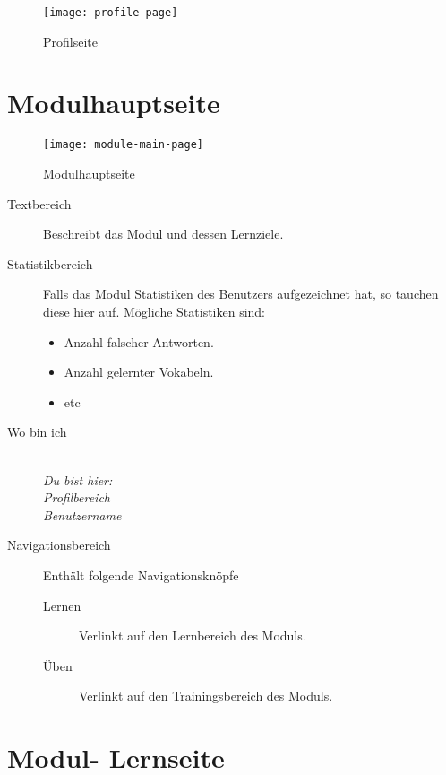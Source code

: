 \begin{figure}[!ht]
  \centering
  \texttt{[image: profile-page]}\\
  \caption{Profilseite}
  \label{fig:profile-page}
\end{figure}



%
%
%
\section*{Modulhauptseite}
\label{sec:module-main-page}

\begin{figure}[!ht]
  \centering
  \texttt{[image: module-main-page]}\\
  \caption{Modulhauptseite}
  \label{fig:module-main-page}
\end{figure}

\begin{description}
  \item[Textbereich] Beschreibt das Modul und dessen Lernziele.
  \item[Statistikbereich] 
    Falls das Modul Statistiken des Benutzers aufgezeichnet hat, so tauchen diese hier auf. Mögliche Statistiken sind:
    \begin{itemize}
      \item Anzahl falscher Antworten.
      \item Anzahl gelernter Vokabeln.
      \item etc
    \end{itemize}
  \item[Wo bin ich] 
    \emph{\\Du bist hier:\\Profilbereich\\Benutzername}
  \item[Navigationsbereich] Enthält folgende Navigationsknöpfe \\
   \begin{description}
    \item[Lernen] Verlinkt auf den Lernbereich des Moduls.
    \item[Üben] Verlinkt auf den Trainingsbereich des Moduls.
   \end{description}
\end{description}

%
%
%
\section*{Modul- Lernseite}
\label{sec:hauptseite}

